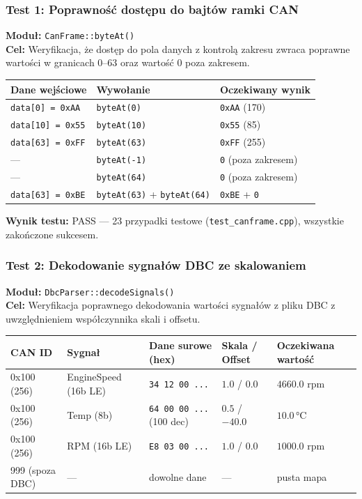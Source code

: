 \documentclass[12pt, a4paper]{article}
\begin{document}
\subsubsection{Test 1: Poprawność dostępu do bajtów ramki CAN}

\textbf{Moduł:} \texttt{CanFrame::byteAt()} \\
\textbf{Cel:} Weryfikacja, że dostęp do pola danych z kontrolą zakresu
zwraca poprawne wartości w granicach 0--63 oraz wartość 0 poza zakresem.

\begin{table}[H]
\centering
\small
\begin{tabular}{p{2.5cm}p{4.5cm}p{4.5cm}}
\toprule
\textbf{Dane wejściowe} & \textbf{Wywołanie} & \textbf{Oczekiwany wynik} \\
\midrule
\texttt{data[0] = 0xAA} & \texttt{byteAt(0)}  & \texttt{0xAA} (170) \\
\texttt{data[10] = 0x55} & \texttt{byteAt(10)} & \texttt{0x55} (85) \\
\texttt{data[63] = 0xFF} & \texttt{byteAt(63)} & \texttt{0xFF} (255) \\
--- & \texttt{byteAt(-1)}  & \texttt{0} (poza zakresem) \\
--- & \texttt{byteAt(64)}  & \texttt{0} (poza zakresem) \\
\texttt{data[63] = 0xBE} & \texttt{byteAt(63)} + \texttt{byteAt(64)} & \texttt{0xBE} + \texttt{0} \\
\bottomrule
\end{tabular}
\end{table}

\textbf{Wynik testu:} PASS --- 23 przypadki testowe (\texttt{test\_canframe.cpp}), wszystkie zakończone sukcesem.

\subsubsection{Test 2: Dekodowanie sygnałów DBC ze skalowaniem}

\textbf{Moduł:} \texttt{DbcParser::decodeSignals()} \\
\textbf{Cel:} Weryfikacja poprawnego dekodowania wartości sygnałów
z pliku DBC z uwzględnieniem współczynnika skali i offsetu.

\begin{table}[H]
\centering
\small
\begin{tabular}{p{2.0cm}p{2.5cm}p{3.0cm}p{3.0cm}p{3.0cm}}
\toprule
\textbf{CAN ID} & \textbf{Sygnał} & \textbf{Dane surowe (hex)} & \textbf{Skala / Offset} & \textbf{Oczekiwana wartość} \\
\midrule
0x100 (256) & EngineSpeed (16b LE) & \texttt{34 12 00 ...} & $1.0$ / $0.0$ & $4660.0$ rpm \\
0x100 (256) & Temp (8b) & \texttt{64 00 00 ...} (100 dec) & $0.5$ / $-40.0$ & $10.0$\,°C \\
0x100 (256) & RPM (16b LE) & \texttt{E8 03 00 ...} & $1.0$ / $0.0$ & $1000.0$ rpm \\
999 (spoza DBC) & --- & dowolne dane & --- & pusta mapa \\
\bottomrule
\end{tabular}
\end{table}
\end{document}
